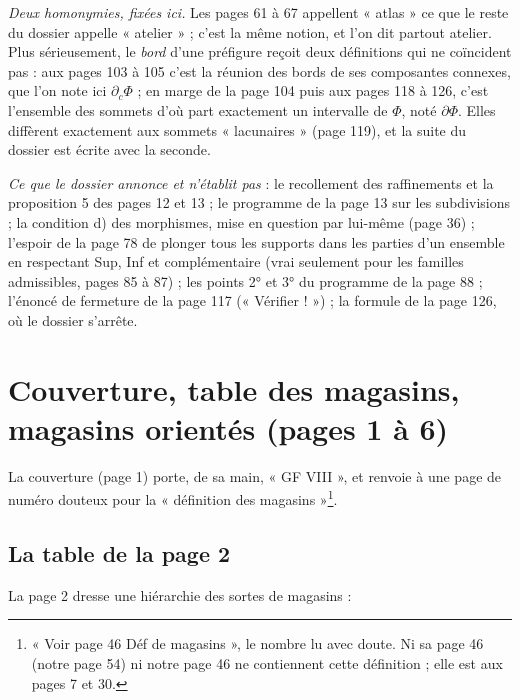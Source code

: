 \documentclass[11pt,a4paper]{article}
\begin{document}
\emph{Deux homonymies, fixées ici.} Les pages 61 à 67 appellent « atlas » ce
que le reste du dossier appelle « atelier » ; c'est la même notion, et l'on dit
partout atelier. Plus sérieusement, le \emph{bord} d'une préfigure reçoit deux
définitions qui ne coïncident pas : aux pages 103 à 105 c'est la réunion des
bords de ses composantes connexes, que l'on note ici $\partial_{c}\Phi$ ; en
marge de la page 104 puis aux pages 118 à 126, c'est l'ensemble des sommets
d'où part exactement un intervalle de $\Phi$, noté $\partial\Phi$. Elles
diffèrent exactement aux sommets « lacunaires » (page 119), et la suite du
dossier est écrite avec la seconde.

\emph{Ce que le dossier annonce et n'établit pas} : le recollement des
raffinements et la proposition 5 des pages 12 et 13 ; le programme de la page
13 sur les subdivisions ; la condition d) des morphismes, mise en question par
lui-même (page 36) ; l'espoir de la page 78 de plonger tous les supports dans
les parties d'un ensemble en respectant Sup, Inf et complémentaire (vrai
seulement pour les familles admissibles, pages 85 à 87) ; les points 2° et 3°
du programme de la page 88 ; l'énoncé de fermeture de la page 117
(« Vérifier ! ») ; la formule de la page 126, où le dossier s'arrête.

\section*{Couverture, table des magasins, magasins orientés (pages 1 à 6)}

La couverture (page 1) porte, de sa main, « GF VIII », et renvoie à une page
de numéro douteux pour la « définition des magasins »\footnote{« Voir page 46
Déf de magasins », le nombre lu avec doute. Ni sa page 46 (notre page 54) ni
notre page 46 ne contiennent cette définition ; elle est aux pages 7 et 30.}.

\subsection*{La table de la page 2}

La page 2 dresse une hiérarchie des sortes de magasins :

\end{document}
